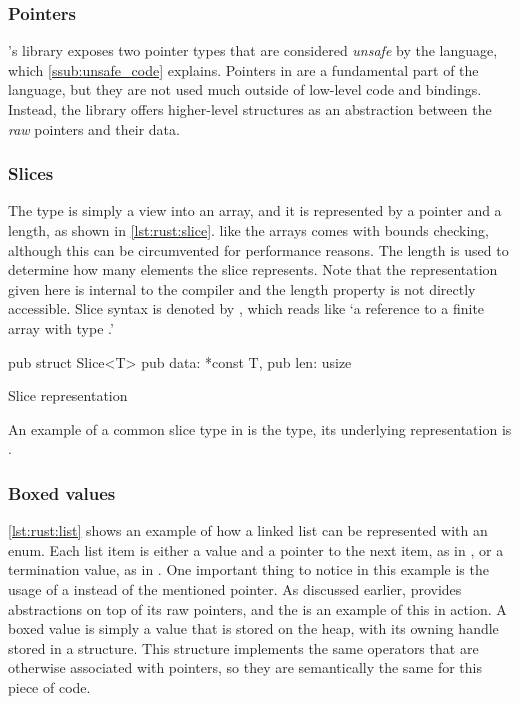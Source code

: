 \subsubsection{Pointers}

\rust's {\core} library exposes two pointer types that are considered \emph{unsafe} by the language, which \autoref{ssub:unsafe_code} explains.
Pointers in {\rust} are a fundamental part of the language, but they are not used much outside of low-level code and bindings.
Instead, the library offers higher-level structures as an abstraction between the \emph{raw} pointers and their data.

\subsubsection{Slices}

The  type is simply a view into an array, and it is represented by a pointer and a length, as shown in \autoref{lst:rust:slice}.
 like the arrays comes with bounds checking, although this can be circumvented for performance reasons.
The length is used to determine how many elements the slice represents.
Note that the representation given here is internal to the compiler and the length property is not directly accessible.
Slice syntax is denoted by \code{\&[T]}, which reads like `a reference to a finite array with type .'

\begin{listing}[H]
  \begin{rustcode}
pub struct Slice<T> {
  pub data: *const T,
  pub len: usize
}
\end{rustcode}
\caption{Slice representation}
\label{lst:rust:slice}
\end{listing}

An example of a common slice type in {\rust} is the  type, its underlying representation is \code{&[u8]}.

\subsubsection{Boxed values}

\autoref{lst:rust:list} shows an example of how a linked list can be represented with an enum.
Each list item is either a value and a pointer to the next item, as in , or a termination value, as in .
One important thing to notice in this example is the usage of a  instead of the mentioned pointer.
As discussed earlier, {\rust} provides abstractions on top of its raw pointers, and the  is an example of this in action.
A boxed value is simply a value that is stored on the heap, with its owning handle stored in a  structure.
This structure implements the same operators that are otherwise associated with pointers, so they are semantically the same for this piece of code.


